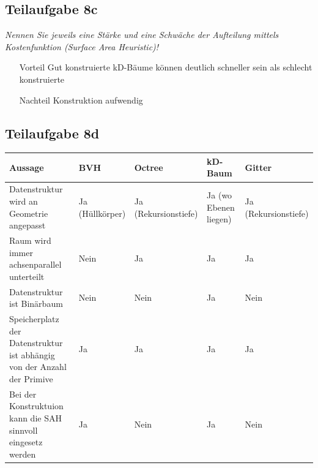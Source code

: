 \documentclass[a4paper]{scrartcl}
\begin{document}
\subsection*{Teilaufgabe 8c}
\textit{Nennen Sie jeweils eine Stärke und eine Schwäche der Aufteilung mittels Kostenfunktion (Surface Area Heuristic)!}

\begin{itemize}
    \item[Vorteil] Gut konstruierte kD-Bäume können deutlich schneller sein als schlecht konstruierte
    \item[Nachteil] Konstruktion aufwendig
\end{itemize}


\subsection*{Teilaufgabe 8d}
\begin{tabular}{p{4cm}p{2.2cm}p{2.2cm}p{2.2cm}p{2.2cm}}\toprule
Aussage                                                                 & BVH             & Octree               & kD-Baum               & Gitter               \\\midrule
Datenstruktur wird an Geometrie angepasst                               & Ja (Hüllkörper) & Ja (Rekursionstiefe) & Ja (wo Ebenen liegen) & Ja (Rekursionstiefe) \\
Raum wird immer achsen\-parallel unterteilt                               & Nein            & Ja                   & Ja                    & Ja                   \\
Datenstruktur ist Binär\-baum                                             & Nein            & Nein                 & Ja                    & Nein                 \\
Speicherplatz der Daten\-struktur ist abhängig von der Anzahl der Primive & Ja              & Ja                   & Ja                    & Ja                   \\
Bei der Konstruktuion kann die SAH sinnvoll eingesetz werden            & Ja\footnotemark            & Nein                 & Ja                    & Nein                 \\\bottomrule
\end{tabular}
\end{document}
